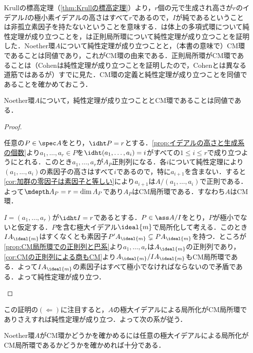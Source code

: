 Krullの標高定理（\ref{thm:Krullの標高定理}）より，$r$個の元で生成され高さが$r$のイデアル$I$の極小素イデアルの高さはすべて$r$であるので，$I$が純であるということは非孤立素因子を持たないということを意味する．\cite{Macaulay1916}は体上の多項式環について純性定理が成り立つことを，\cite{Cohen1946}は正則局所環について純性定理が成り立つことを証明した．Noether環$A$について純性定理が成り立つことと，（本書の意味で）CM環であることは同値であり，これがCM環の由来である．正則局所環がCM環であることは（Cohenは純性定理が成り立つことを証明したので，Cohenとは異なる道筋ではあるが）すでに見た．CM環の定義と純性定理が成り立つことを同値であることを確かめておこう．

\begin{thm}
	Noether環$A$について，純性定理が成り立つこととCM環であることは同値である．
\end{thm}

\begin{proof}
	\begin{eqv}
		\item 任意の$P\in\spec A$をとり，$\idht P=r$とする．\ref{prop:イデアルの高さと生成系の個数}より$a_1,\dots,a_r\in P$を$\idht(a_1,\dots,a_i)=i$がすべての$1\leq i\leq r$で成り立つようにとれる．このとき$a_1,\dots,a_r$が$A_P$正則列になる．各$i$について純性定理により$(a_1,\dots,a_i)$の素因子の高さはすべて$i$であるので，特に$a_{i+1}$を含まない．すると\ref{cor:加群の零因子は素因子と等しい}により$a_{i+1}$は$A/(a_1,\dots,a_i)$で正則である．よって$\mdepth A_P=r=\dim A_P$であり$A_P$はCM局所環である．すなわち$A$はCM環．
		\item $I=(a_1,\dots,a_r)$が$\idht I=r$であるとする．$P\in\ass A/I$をとり，$P$が極小でないと仮定する．$P$を含む極大イデアル$\ideal{m}$で局所化して考える．このとき$IA_{\ideal{m}}$はすくなくとも素因子$P'A_{\ideal{m}}\subsetneq PA_{\ideal{m}}$を持つ．ところが\ref{prop:CM局所環での正則列と巴系}より$a_1,\dots,a_r$は$A_{\ideal{m}}$の正則列であり，\ref{cor:CMの正則列による商もCM}より$A_{\ideal{m}}/IA_{\ideal{m}}$もCM局所環である．よって$IA_{\ideal{m}}$の素因子はすべて極小でなければならないので矛盾である．よって純性定理が成り立つ．
	\end{eqv}
\end{proof}

この証明の$(\Longleftarrow)$に注目すると，$A$の極大イデアルによる局所化がCM局所環でありさえすれば純性定理が成り立つ．よって次の系が従う．

\begin{cor}
	Noether環$A$がCM環かどうかを確かめるには任意の極大イデアルによる局所化がCM局所環であるかどうかを確かめれば十分である．
\end{cor}

